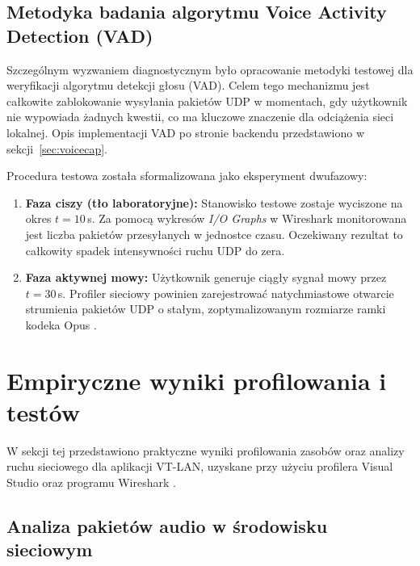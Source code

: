 \subsection{Metodyka badania algorytmu Voice Activity Detection (VAD)}
\label{subsec:db_vad_metodyka}

Szczególnym wyzwaniem diagnostycznym było opracowanie metodyki testowej dla
weryfikacji algorytmu detekcji głosu (VAD). Celem tego mechanizmu jest całkowite
zablokowanie wysyłania pakietów UDP w momentach, gdy użytkownik nie wypowiada
żadnych kwestii, co ma kluczowe znaczenie dla odciążenia sieci lokalnej. Opis
implementacji VAD po stronie backendu przedstawiono w sekcji~\ref{sec:voicecap}.

Procedura testowa została sformalizowana jako eksperyment dwufazowy:

\begin{enumerate}
	\item \textbf{Faza ciszy (tło laboratoryjne):} Stanowisko testowe zostaje
	wyciszone na okres $t = 10$\,s. Za pomocą wykresów \textit{I/O Graphs}
	w Wireshark \cite{wireshark_doc} monitorowana jest liczba pakietów
	przesyłanych w jednostce czasu. Oczekiwany rezultat to całkowity spadek
	intensywności ruchu UDP do zera.
	\item \textbf{Faza aktywnej mowy:} Użytkownik generuje ciągły sygnał mowy
	przez $t = 30$\,s. Profiler sieciowy powinien zarejestrować natychmiastowe
	otwarcie strumienia pakietów UDP o stałym, zoptymalizowanym rozmiarze ramki
	kodeka Opus \cite{OpusRFC}.
\end{enumerate}

\section{Empiryczne wyniki profilowania i testów}
\label{sec:db_wyniki}

W sekcji tej przedstawiono praktyczne wyniki profilowania zasobów oraz analizy
ruchu sieciowego dla aplikacji VT-LAN, uzyskane przy użyciu profilera Visual Studio
\cite{msvc_profiler} oraz programu Wireshark \cite{wireshark_doc}.

\subsection{Analiza pakietów audio w środowisku sieciowym}
\label{subsec:db_analiza_audio}

